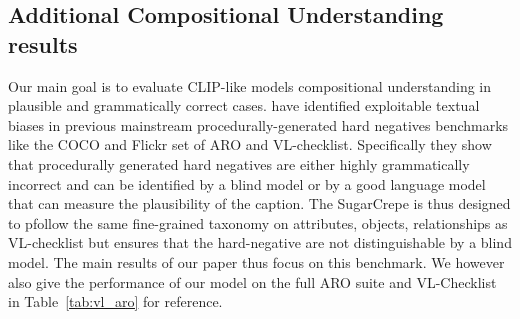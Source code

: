 \subsection{Additional Compositional Understanding results}\label{app:vl}
Our main goal is to evaluate CLIP-like models compositional understanding in plausible and grammatically correct cases. \citet{hsieh2023sugarcrepefixinghackablebenchmarks} have identified exploitable textual biases in previous mainstream procedurally-generated hard negatives benchmarks like the COCO and Flickr set of ARO and VL-checklist. Specifically they show that procedurally generated hard negatives are either highly grammatically incorrect and can be identified by a blind model or by a good language model that can measure the plausibility of the caption. The SugarCrepe is thus designed to  pfollow the same fine-grained taxonomy on attributes, objects, relationships as VL-checklist but ensures that the hard-negative are not distinguishable by a blind model. The main results of our paper thus focus on this benchmark. We however also give the performance of our model on the full ARO suite and VL-Checklist in Table~\ref{tab:vl_aro} for reference.  
